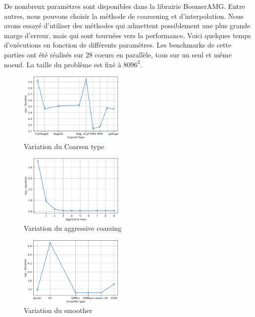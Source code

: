 \documentclass[10pt,twocolumn,letterpaper]{article}
\begin{document}
De nombreux paramètres sont disponibles dans la librairie BoomerAMG. Entre
autres, nous pouvons choisir la méthode de coarsening et d'interpolation.
Nous avons essayé d'utiliser des méthodes qui admettent possiblement une plus
grande marge d'erreur, mais qui sont tournées vers la performance.
Voici quelques temps d'exécutions en fonction de différents paramètres. Les
benchmarks de cette parties ont été réalisés sur $28$ coeurs en parallèle, tous
sur un seul et même noeud. La taille du problème est fixé à $8096^2$.

\begin{figure}[H]
  \centering
  \caption{Variation du Coarsen type}
  \includegraphics[width=0.45\textwidth]{fig/strong_coarsen_type.png}
\end{figure}

\begin{figure}[H]
    \centering
    \caption{Variation du aggressive coarsing}
    \includegraphics[width=0.45\textwidth]{fig/strong_agg_level.png}
  \end{figure}

  \begin{figure}[H]
    \centering
    \caption{Variation du smoother}
    \includegraphics[width=0.45\textwidth]{fig/strong_smoother.png}
  \end{figure}
\end{document}
